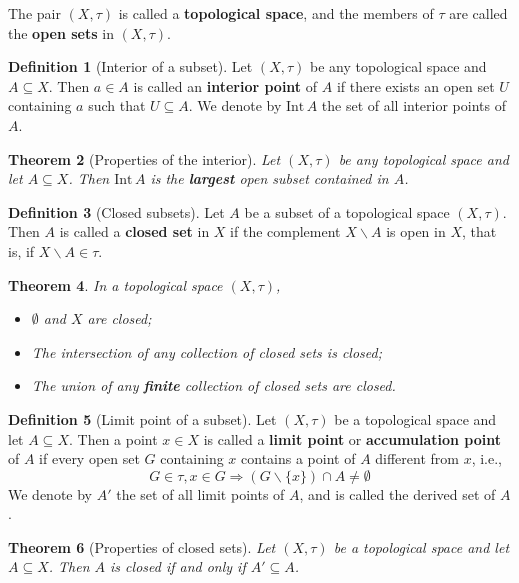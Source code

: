 \documentclass[10pt, oneside, reqno]{amsart}
\theoremstyle{plain}%
\newtheorem{thm}{Theorem}[section]
\theoremstyle{definition}
\newtheorem{defn}[thm]{Definition}
\theoremstyle{remark}
\newcommand{\topo}{(X,\tau)}
\newcommand{\intr}{\text{Int}\,}
\begin{document}
The pair $(X, \tau)$ is called a \textbf{topological space}, and the members of $\tau$ are called the \textbf{open sets} in $(X, \tau)$. 


\begin{defn}[Interior of a subset]
	Let $\topo$ be any topological space and $A \subseteq X$.  Then $a \in A$ is called an \textbf{interior point} of $A$ if there exists an open set $U$ containing $a$ such that $U \subseteq A$.  We denote by $\intr A$ the set of all interior points of $A$.
\end{defn}

\begin{thm}[Properties of the interior]
	Let $\topo$ be any topological space and let $A \subseteq X$.  Then $\intr A$ is the \textbf{largest} open subset contained in $A$.
\end{thm}

\begin{defn}[Closed subsets]
	Let $A$ be a subset of a topological space $\topo$.  Then $A$ is called a \textbf{closed set} in $X$ if the complement $X \backslash A$ is open in $X$, that is, if $X \backslash A \in \tau$.
\end{defn}

\begin{thm}
	In a topological space $\topo$,
	\begin{itemize}
		\item $\emptyset$ and $X$ are closed;
		\item The intersection of any collection of closed sets is closed;
		\item The union of any \textbf{finite} collection of closed sets are closed.
	\end{itemize}
\end{thm}

\begin{defn}[Limit point of a subset]
	Let $\topo$ be a topological space and let $A \subseteq X$.  Then a point $x \in X$ is called a \textbf{limit point} or \textbf{accumulation point} of $A$ if every open set $G$ containing $x$ contains a point of $A$ different from $x$, i.e.,\[
		G \in \tau, x \in G \Rightarrow (G \backslash \{x \}) \cap A \neq \emptyset
	\]
We denote by $A'$ the set of all limit points of $A$, and is called the derived set of $A$.
\end{defn}

\begin{thm}[Properties of closed sets]
	Let $\topo$ be a topological space and let $A \subseteq X$.  Then $A$ is closed if and only if $A' \subseteq A$.
\end{thm}
\end{document}
